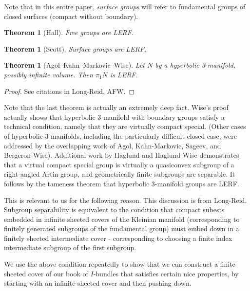 \documentclass[12pt]{amsart}
\newtheorem{thm}[theorem]{Theorem}
\theoremstyle{definition}
\theoremstyle{remark}
\begin{document}
Note that in this entire paper, \emph{surface groups} will refer to fundamental
groups of closed surfaces (compact without boundary).

\begin{thm}[Hall] Free groups are LERF. \end{thm}

\begin{thm}[Scott] Surface groups are LERF. \end{thm}

\begin{thm}[Agol--Kahn--Markovic--Wise] Let $N$ by a hyperbolic 3-manifold,
possibly infinite volume.  Then $\pi_1N$ is LERF. \end{thm}

\begin{proof}

See citations in Long-Reid, AFW.

\end{proof}

Note that the last theorem is actually an extremely deep fact. Wise's proof
actually shows that hyperbolic 3-manifold with boundary groups satisfy
a technical condition, namely that they are virtually compact special. (Other
cases of hyperbolic 3-manifolds, including the particularly difficult closed
case, were addressed by the overlapping work of Agol, Kahn-Markovic, Sageev,
and Bergeron-Wise).  Additional work by Haglund and Haglund-Wise demonstrates
that a virtual compact special group is virtually a quasiconvex subgroup of
a right-angled Artin group, and geometrically finite subgroups are separable.
It follows by the tameness theorem that hyperbolic 3-manifold groups are LERF.

This is relevant to us for the following reason. This discussion is from
Long-Reid. Subgroup separability is equivalent to the condition that compact
subests embedded in infinite sheeted covers of the Kleinian manifold
(corresponding to finitely generated subgroups of the fundamental group) must
embed down in a finitely sheeted intermediate cover - corresponding to choosing
a finite index intermediate subgroup of the first subgroup.


We use the above condition repeatedly to show that we can construct
a finite-sheeted cover of our book of $I$-bundles that satisfies certain nice
properties, by starting with an infinite-sheeted cover and then pushing down.
\end{document}
